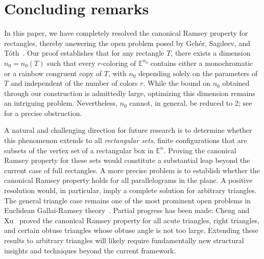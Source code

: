 \documentclass[11pt]{article}
\theoremstyle{definition}
\begin{document}
\section{Concluding remarks}
In this paper, we have completely resolved the canonical Ramsey property for rectangles, thereby answering the open problem posed by Geh\'{e}r, Sagdeev, and T\'{o}th~\cite{2024Cano}. Our proof establishes that for any rectangle \(T\), there exists a dimension \(n_0 = n_0(T)\) such that every \(r\)-coloring of \(\mathbb{E}^{n_0}\) contains either a monochromatic or a rainbow congruent copy of \(T\), with \(n_0\) depending solely on the parameters of \(T\) and independent of the number of colors \(r\). While the bound on \(n_0\) obtained through our construction is admittedly large, optimizing this dimension remains an intriguing problem. Nevertheless, \(n_0\) cannot, in general, be reduced to 2; see~\cite[Theorem~1.3]{2022arxivEGR} for a precise obstruction.

A natural and challenging direction for future research is to determine whether this phenomenon extends to all \emph{rectangular sets}, finite configurations that are subsets of the vertex set of a rectangular box in \(\mathbb{E}^n\). Proving the canonical Ramsey property for these sets would constitute a substantial leap beyond the current case of full rectangles. A more precise problem is to establish whether the canonical Ramsey property holds for all parallelograms in the plane. A positive resolution would, in particular, imply a complete solution for arbitrary triangles. The general triangle case remains one of the most prominent open problems in Euclidean Gallai-Ramsey theory~\cite{2024Cano}. Partial progress has been made: Cheng and Xu~\cite{2025DCGChengXu} proved the canonical Ramsey property for all acute triangles, right triangles, and certain obtuse triangles whose obtuse angle is not too large. Extending these results to arbitrary triangles will likely require fundamentally new structural insights and techniques beyond the current framework.






\end{document}
